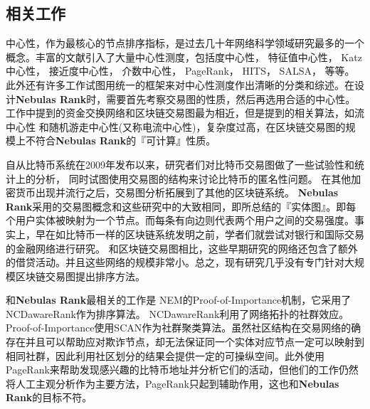 \subsection{相关工作}
中心性，作为最核心的节点排序指标，是过去几十年网络科学领域研究最多的一个概念\cite{newman2010networks}。丰富的文献引入了大量中心性测度，包括度中心性\cite{freeman1979set}， 特征值中心性\cite{bonacich1972factoring}， Katz中心性\cite{katz1953new}， 接近度中心性\cite{sabidussi1966centrality}， 介数中心性\cite{freeman1977set}\cite{freeman1978centrality}\cite{freeman1991centrality}\cite{noh2004random}\cite{newman2005measure}， PageRank\cite{Brin2010}， HITS\cite{kleinberg1999authoritative}， SALSA\cite{Science2001}， 等等。此外还有许多工作试图用统一的框架来对中心性测度作出清晰的分类和综述\cite{Borgatti2005}\cite{Borgatti2006}\cite{Lu2016}。在设计\textbf{Nebulas Rank}时，需要首先考察交易图的性质，然后再选用合适的中心性。\textcite{Borgatti2005}工作中提到的资金交换网络和区块链交易图最为相近，但是提到的相关算法，如流中心性\cite{freeman1991centrality} 和随机游走中心性(又称电流中心性)\cite{newman2005measure}，复杂度过高，在区块链交易图的规模上不符合\textbf{Nebulas Rank}的『可计算』性质。

自从比特币\cite{Nakamoto2008}系统在2009年发布以来，研究者们对比特币交易图做了一些试验性和统计上的分析\cite{Ron}\cite{Haslhofer}\cite{NielKondor2014}\cite{Baumann2014}， 同时试图使用交易图的结构来讨论比特币的匿名性问题\cite{Meiklejohn2013}\cite{Ober2013}\cite{pham2016anomaly}\cite{Fleder2015}\cite{Ferrin2015}。 在其他加密货币出现并流行之后，交易图分析拓展到了其他的区块链系统\cite{Chang2017}\cite{Anderson2016}。 \textbf{Nebulas Rank}采用的交易图概念和这些研究中的大致相同，即\textcite{Tschorsch2015}所总结的『实体图』。即每个用户实体被映射为一个节点。而每条有向边则代表两个用户之间的交易强度。事实上，早在如比特币一样的区块链系统发明之前，学者们就尝试对银行和国际交易的金融网络进行研究\cite{propper2008towards}\cite{Boss2004}\cite{Serrano2007}\cite{Bech2008}\cite{Fagiolo2009}\cite{Morten2006}\cite{Boss2004a}\cite{Krempel2002}\cite{Serrano2003}。 和区块链交易图相比，这些早期研究的网络还包含了额外的借贷活动。并且这些网络的规模非常小。总之，现有研究几乎没有专门针对大规模区块链交易图提出排序方法。

和\textbf{Nebulas Rank}最相关的工作是 NEM\cite{nem}的Proof-of-Importance机制，它采用了 NCDawareRank\cite{Nikolakopoulos2013}作为排序算法。 NCDawareRank\cite{Nikolakopoulos2013}利用了网络拓扑的社群效应。Proof-of-Importance使用SCAN\cite{xu2007scan}\cite{shiokawa2015scan}\cite{chang2017mathsf}作为社群聚类算法。虽然社区结构在交易网络的确存在并且可以帮助应对欺诈节点，却无法保证同一个实体对应节点一定可以映射到相同社群，因此利用社区划分的结果会提供一定的可操纵空间。此外\textcite{Fleder2015}使用PageRank来帮助发现感兴趣的比特币地址并分析它们的活动，但他们的工作仍然将人工主观分析作为主要方法，PageRank只起到辅助作用，这也和\textbf{Nebulas Rank}的目标不符。

